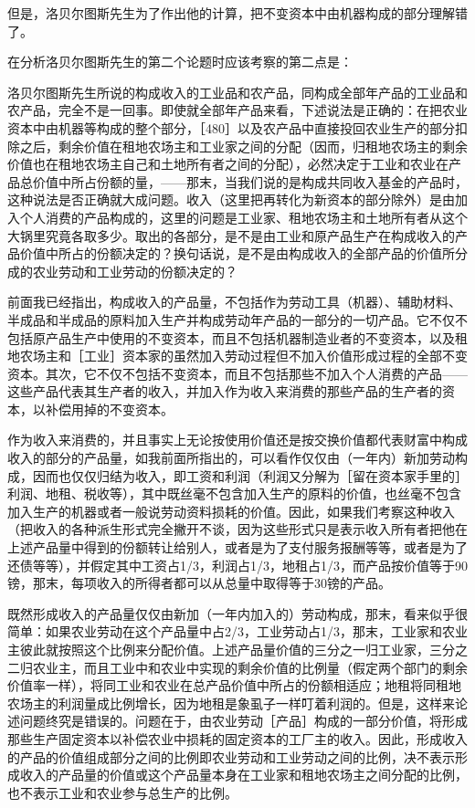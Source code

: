 但是，洛贝尔图斯先生为了作出他的计算，把不变资本中由机器构成的部分理解错了。

在分析洛贝尔图斯先生的第二个论题时应该考察的第二点是：

洛贝尔图斯先生所说的构成收入的工业品和农产品，同构成全部年产品的工业品和农产品，完全不是一回事。即使就全部年产品来看，下述说法是正确的：在把农业资本中由机器等构成的整个部分，［480］以及农产品中直接投回农业生产的部分扣除之后，剩余价值在租地农场主和工业家之间的分配（因而，归租地农场主的剩余价值也在租地农场主自己和土地所有者之间的分配），必然决定于工业和农业在产品总价值中所占份额的量，——那末，当我们说的是构成共同收入基金的产品时，这种说法是否正确就大成问题。收入（这里把再转化为新资本的部分除外）是由加入个人消费的产品构成的，这里的问题是工业家、租地农场主和土地所有者从这个大锅里究竟各取多少。取出的各部分，是不是由工业和原产品生产在构成收入的产品价值中所占的份额决定的？换句话说，是不是由构成收入的全部产品的价值所分成的农业劳动和工业劳动的份额决定的？

前面我已经指出，构成收入的产品量，不包括作为劳动工具（机器）、辅助材料、半成品和半成品的原料加入生产并构成劳动年产品的一部分的一切产品。它不仅不包括原产品生产中使用的不变资本，而且不包括机器制造业者的不变资本，以及租地农场主和［工业］资本家的虽然加入劳动过程但不加入价值形成过程的全部不变资本。其次，它不仅不包括不变资本，而且不包括那些不加入个人消费的产品——这些产品代表其生产者的收入，并加入作为收入来消费的那些产品的生产者的资本，以补偿用掉的不变资本。

作为收入来消费的，并且事实上无论按使用价值还是按交换价值都代表财富中构成收入的部分的产品量，如我前面所指出的，可以看作仅仅由（一年内）新加劳动构成，因而也仅仅归结为收入，即工资和利润（利润又分解为［留在资本家手里的］利润、地租、税收等），其中既丝毫不包含加入生产的原料的价值，也丝毫不包含加入生产的机器或者一般说劳动资料损耗的价值。因此，如果我们考察这种收入（把收入的各种派生形式完全撇开不谈，因为这些形式只是表示收入所有者把他在上述产品量中得到的份额转让给别人，或者是为了支付服务报酬等等，或者是为了还债等等），并假定其中工资占1/3，利润占1/3，地租占1/3，而产品按价值等于90镑，那末，每项收入的所得者都可以从总量中取得等于30镑的产品。

既然形成收入的产品量仅仅由新加（一年内加入的）劳动构成，那末，看来似乎很简单：如果农业劳动在这个产品量中占2/3，工业劳动占1/3，那末，工业家和农业主彼此就按照这个比例来分配价值。上述产品量价值的三分之一归工业家，三分之二归农业主，而且工业中和农业中实现的剩余价值的比例量（假定两个部门的剩余价值率一样），将同工业和农业在总产品价值中所占的份额相适应；地租将同租地农场主的利润量成比例增长，因为地租是象虱子一样叮着利润的。但是，这样来论述问题终究是错误的。问题在于，由农业劳动［产品］构成的一部分价值，将形成那些生产固定资本以补偿农业中损耗的固定资本的工厂主的收入。因此，形成收入的产品的价值组成部分之间的比例即农业劳动和工业劳动之间的比例，决不表示形成收入的产品量的价值或这个产品量本身在工业家和租地农场主之间分配的比例，也不表示工业和农业参与总生产的比例。

